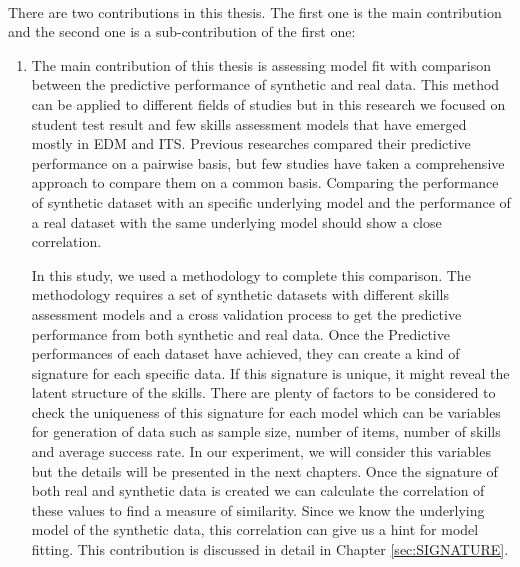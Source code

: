\paragraph{}There are two contributions in this thesis. The first one is the main contribution and the second one is a sub-contribution of the first one:
\begin{enumerate}
\item The main contribution of this thesis is assessing model fit with comparison between the predictive performance of synthetic and real data. This method can be applied to different fields of studies but in this research we focused on student test result and few skills assessment models that have emerged mostly in EDM and ITS. Previous researches compared their predictive performance  on a pairwise basis, but few studies have taken a comprehensive approach to compare them on a common basis. Comparing the performance of synthetic dataset with an specific underlying model and the performance of a real dataset with the same underlying model should show a close correlation. 

In this study, we used a methodology to complete this comparison. The methodology requires a set of synthetic datasets with different skills assessment models and a cross validation process to get the predictive performance from both synthetic and real data. Once the Predictive performances of each dataset have achieved, they can create a kind of signature for each specific data. If this signature is unique, it might reveal the latent structure of the skills. There are plenty of factors to be considered to check the uniqueness of this signature for each model which can be variables for generation of data such as sample size, number of items, number of skills and average success rate. In our experiment, we will consider this variables but the details will be presented in the next chapters. Once the signature of both real and synthetic data is created we can calculate the correlation of these values to find a measure of similarity. Since we know the underlying model of the synthetic data, this correlation can give us a hint for model fitting. This contribution is discussed in detail in Chapter \ref{sec:SIGNATURE}.


\end{enumerate}
